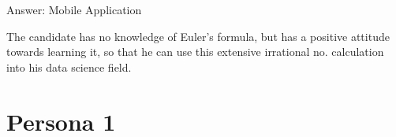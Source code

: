 \documentclass[12pt]{report}
\begin{document}
Answer: Mobile Application\par


\vspace{\baselineskip}
{\fontsize{14pt}{16.8pt} }The candidate has no knowledge of Euler’s formula, but has a positive attitude towards learning it, so that he can use this extensive irrational no. calculation into his data science field.\par


\vspace{\baselineskip}

\vspace{\baselineskip}

\vspace{\baselineskip}

\vspace{\baselineskip}

\vspace{\baselineskip}

\vspace{\baselineskip}

\vspace{\baselineskip}

\vspace{\baselineskip}

\vspace{\baselineskip}

\vspace{\baselineskip}

\vspace{\baselineskip}

\vspace{\baselineskip}
\section*{Persona 1}

\vspace{\baselineskip}


\end{document}
